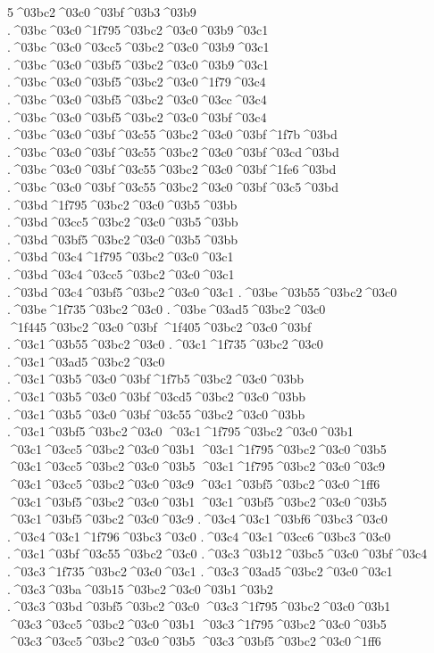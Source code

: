 {5^^^^03bc2^^^^03c0^^^^03bf^^^^03b3^^^^03b9
.^^^^03bc^^^^03c0^^^^1f795^^^^03bc2^^^^03c0^^^^03b9^^^^03c1  .^^^^03bc^^^^03c0^^^^03cc5^^^^03bc2^^^^03c0^^^^03b9^^^^03c1
.^^^^03bc^^^^03c0^^^^03bf5^^^^03bc2^^^^03c0^^^^03b9^^^^03c1
.^^^^03bc^^^^03c0^^^^03bf5^^^^03bc2^^^^03c0^^^^1f79^^^^03c4  .^^^^03bc^^^^03c0^^^^03bf5^^^^03bc2^^^^03c0^^^^03cc^^^^03c4
.^^^^03bc^^^^03c0^^^^03bf5^^^^03bc2^^^^03c0^^^^03bf^^^^03c4
.^^^^03bc^^^^03c0^^^^03bf^^^^03c55^^^^03bc2^^^^03c0^^^^03bf^^^^1f7b^^^^03bd  .^^^^03bc^^^^03c0^^^^03bf^^^^03c55^^^^03bc2^^^^03c0^^^^03bf^^^^03cd^^^^03bd
.^^^^03bc^^^^03c0^^^^03bf^^^^03c55^^^^03bc2^^^^03c0^^^^03bf^^^^1fe6^^^^03bd
.^^^^03bc^^^^03c0^^^^03bf^^^^03c55^^^^03bc2^^^^03c0^^^^03bf^^^^03c5^^^^03bd
.^^^^03bd^^^^1f795^^^^03bc2^^^^03c0^^^^03b5^^^^03bb  .^^^^03bd^^^^03cc5^^^^03bc2^^^^03c0^^^^03b5^^^^03bb
.^^^^03bd^^^^03bf5^^^^03bc2^^^^03c0^^^^03b5^^^^03bb
.^^^^03bd^^^^03c4^^^^1f795^^^^03bc2^^^^03c0^^^^03c1  .^^^^03bd^^^^03c4^^^^03cc5^^^^03bc2^^^^03c0^^^^03c1
.^^^^03bd^^^^03c4^^^^03bf5^^^^03bc2^^^^03c0^^^^03c1
.^^^^03be^^^^03b55^^^^03bc2^^^^03c0
.^^^^03be^^^^1f735^^^^03bc2^^^^03c0  .^^^^03be^^^^03ad5^^^^03bc2^^^^03c0
^^^^1f445^^^^03bc2^^^^03c0^^^^03bf
^^^^1f405^^^^03bc2^^^^03c0^^^^03bf
.^^^^03c1^^^^03b55^^^^03bc2^^^^03c0
.^^^^03c1^^^^1f735^^^^03bc2^^^^03c0  .^^^^03c1^^^^03ad5^^^^03bc2^^^^03c0
.^^^^03c1^^^^03b5^^^^03c0^^^^03bf^^^^1f7b5^^^^03bc2^^^^03c0^^^^03bb  .^^^^03c1^^^^03b5^^^^03c0^^^^03bf^^^^03cd5^^^^03bc2^^^^03c0^^^^03bb
.^^^^03c1^^^^03b5^^^^03c0^^^^03bf^^^^03c55^^^^03bc2^^^^03c0^^^^03bb
.^^^^03c1^^^^03bf5^^^^03bc2^^^^03c0
^^^^03c1^^^^1f795^^^^03bc2^^^^03c0^^^^03b1  ^^^^03c1^^^^03cc5^^^^03bc2^^^^03c0^^^^03b1
^^^^03c1^^^^1f795^^^^03bc2^^^^03c0^^^^03b5  ^^^^03c1^^^^03cc5^^^^03bc2^^^^03c0^^^^03b5
^^^^03c1^^^^1f795^^^^03bc2^^^^03c0^^^^03c9  ^^^^03c1^^^^03cc5^^^^03bc2^^^^03c0^^^^03c9
^^^^03c1^^^^03bf5^^^^03bc2^^^^03c0^^^^1ff6
^^^^03c1^^^^03bf5^^^^03bc2^^^^03c0^^^^03b1
^^^^03c1^^^^03bf5^^^^03bc2^^^^03c0^^^^03b5
^^^^03c1^^^^03bf5^^^^03bc2^^^^03c0^^^^03c9
.^^^^03c4^^^^03c1^^^^03bf6^^^^03bc3^^^^03c0
.^^^^03c4^^^^03c1^^^^1f796^^^^03bc3^^^^03c0  .^^^^03c4^^^^03c1^^^^03cc6^^^^03bc3^^^^03c0
.^^^^03c1^^^^03bf^^^^03c55^^^^03bc2^^^^03c0
.^^^^03c3^^^^03b12^^^^03bc5^^^^03c0^^^^03bf^^^^03c4
.^^^^03c3^^^^1f735^^^^03bc2^^^^03c0^^^^03c1  .^^^^03c3^^^^03ad5^^^^03bc2^^^^03c0^^^^03c1
.^^^^03c3^^^^03ba^^^^03b15^^^^03bc2^^^^03c0^^^^03b1^^^^03b2
.^^^^03c3^^^^03bd^^^^03bf5^^^^03bc2^^^^03c0
^^^^03c3^^^^1f795^^^^03bc2^^^^03c0^^^^03b1  ^^^^03c3^^^^03cc5^^^^03bc2^^^^03c0^^^^03b1
^^^^03c3^^^^1f795^^^^03bc2^^^^03c0^^^^03b5  ^^^^03c3^^^^03cc5^^^^03bc2^^^^03c0^^^^03b5
^^^^03c3^^^^03bf5^^^^03bc2^^^^03c0^^^^1ff6
}
